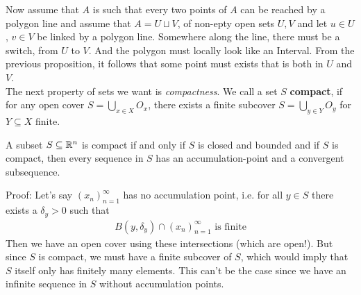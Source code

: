 Now assume that $A$ is such that every two points of $A$ can be reached by a polygon line and assume that $A = U \sqcup V$, of non-epty open sets $U,V$ and let $u \in U$, $v \in V$ be linked by a polygon line. Somewhere along the line, there must be a switch, from $U$ to $V$. And the polygon must locally look like an Interval. From the previous proposition, it follows that some point must exists that is both in $U$ and $V$.\\

The next property of sets we want is \emph{compactness}. We call a set $S$ \textbf{compact}, if for any open cover $S = \bigcup_{x \in X} O_x$, there exists a finite subcover $S = \bigcup_{y \in Y}O_y$ for $Y \subseteq X$ finite.\\

\begin{theorem}[]
	A subset $S \subseteq \mathbb{R}^n$ is compact if and only if $S$ is closed and bounded and if $S$ is compact, then every sequence in $S$ has an accumulation-point and a convergent subsequence.
\end{theorem}
Proof: Let's say $\left(x_{n}\right)_{n = 1}^{\infty}$ has no accumulation point, i.e. for all $y \in S$ there exists a $\delta_y > 0$ such that
\begin{align*}
	B(y,\delta_y) \cap \left(x_{n}\right)_{n = 1}^{\infty} \text{ is finite}
\end{align*}
Then we have an open cover using these intersections (which are open!). But since $S$ is compact, we must have a finite subcover of $S$, which would imply that $S$ itself only has finitely many elements. This can't be the case since we have an infinite sequence in $S$ without accumulation points.
